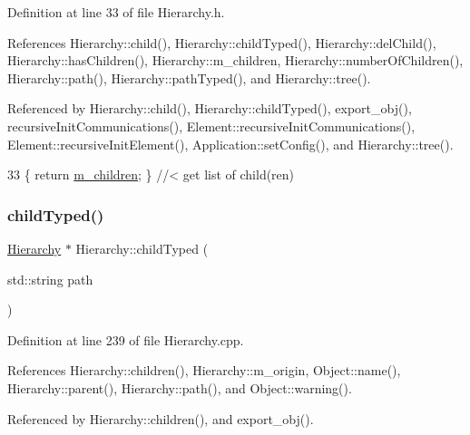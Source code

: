 Definition at line 33 of file Hierarchy.\+h.



References Hierarchy\+::child(), Hierarchy\+::child\+Typed(), Hierarchy\+::del\+Child(), Hierarchy\+::has\+Children(), Hierarchy\+::m\+\_\+children, Hierarchy\+::number\+Of\+Children(), Hierarchy\+::path(), Hierarchy\+::path\+Typed(), and Hierarchy\+::tree().



Referenced by Hierarchy\+::child(), Hierarchy\+::child\+Typed(), export\+\_\+obj(), recursive\+Init\+Communications(), Element\+::recursive\+Init\+Communications(), Element\+::recursive\+Init\+Element(), Application\+::set\+Config(), and Hierarchy\+::tree().


\begin{DoxyCode}
33 \{ \textcolor{keywordflow}{return} \hyperlink{classHierarchy_a038816763941fd4a930504917f60483b}{m\_children};  \} \textcolor{comment}{//< get list of child(ren)}
\end{DoxyCode}
\mbox{\label{classHierarchy_a0c15a5276a3b80b4354d6bd8a01e0708}} 
\subsubsection{\texorpdfstring{child\+Typed()}{childTyped()}}
{\footnotesize\ttfamily \hyperlink{classHierarchy}{Hierarchy} $\ast$ Hierarchy\+::child\+Typed (\begin{DoxyParamCaption}\item[{std\+::string}]{path }\end{DoxyParamCaption})\hspace{0.3cm}{\ttfamily [inherited]}}



Definition at line 239 of file Hierarchy.\+cpp.



References Hierarchy\+::children(), Hierarchy\+::m\+\_\+origin, Object\+::name(), Hierarchy\+::parent(), Hierarchy\+::path(), and Object\+::warning().



Referenced by Hierarchy\+::children(), and export\+\_\+obj().


